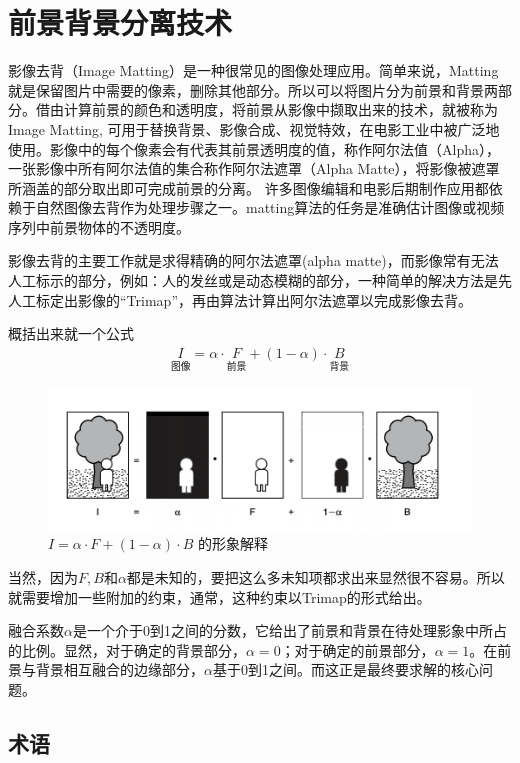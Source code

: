 \documentclass[scheme=chinese,a4paper]{article}
\begin{document}
\section{前景背景分离技术}
影像去背（Image Matting）是一种很常见的图像处理应用\cite{matting}。简单来说，Matting就是保留图片中需要的像素，删除其他部分。所以可以将图片分为前景和背景两部分。借由计算前景的颜色和透明度，将前景从影像中撷取出来的技术，就被称为Image Matting, 可用于替换背景、影像合成、视觉特效，在电影工业中被广泛地使用。影像中的每个像素会有代表其前景透明度的值，称作阿尔法值（Alpha），一张影像中所有阿尔法值的集合称作阿尔法遮罩（Alpha Matte），将影像被遮罩所涵盖的部分取出即可完成前景的分离。
许多图像编辑和电影后期制作应用都依赖于自然图像去背作为处理步骤之一。matting算法的任务是准确估计图像或视频序列中前景物体的不透明度。


影像去背的主要工作就是求得精确的阿尔法遮罩(alpha matte)，而影像常有无法人工标示的部分，例如：人的发丝或是动态模糊的部分，一种简单的解决方法是先人工标定出影像的“Trimap”，再由算法计算出阿尔法遮罩以完成影像去背。


概括出来就一个公式
\begin{align*}
  \underset{\text{图像}}{I} =\alpha\cdot \underset{\text{前景}}{F} +(1-\alpha)\cdot \underset{\text{背景}}{B} 
\end{align*}
\begin{figure}[H]
\centering
\includegraphics[width=1\textwidth]{matting_equ.png}
\caption{$I=\alpha\cdot F+(1-\alpha)\cdot B$ 的形象解释}
\end{figure}
当然，因为$F, B$和$\alpha$都是未知的，要把这么多未知项都求出来显然很不容易。所以就需要增加一些附加的约束，通常，这种约束以Trimap的形式给出。

融合系数$\alpha$是一个介于0到1之间的分数，它给出了前景和背景在待处理影象中所占的比例。显然，对于确定的背景部分，$\alpha=0$；对于确定的前景部分，$\alpha=1$。在前景与背景相互融合的边缘部分，$\alpha$基于0到1之间。而这正是最终要求解的核心问题。

\subsection{术语}
\end{document}
